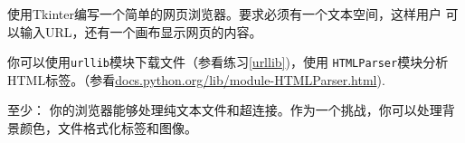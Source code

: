 \begin{ex}

使用Tkinter编写一个简单的网页浏览器。要求必须有一个文本空间，这样用户
可以输入URL，还有一个画布显示网页的内容。


你可以使用{\tt urllib}模块下载文件（参看练习\ref{urllib})，使用
{\tt HTMLParser}模块分析HTML标签。（参看\url{docs.python.org/lib/module-HTMLParser.html}).


至少：
你的浏览器能够处理纯文本文件和超连接。作为一个挑战，你可以处理背景颜色，文件格式化标签和图像。

\end{ex}
















































































